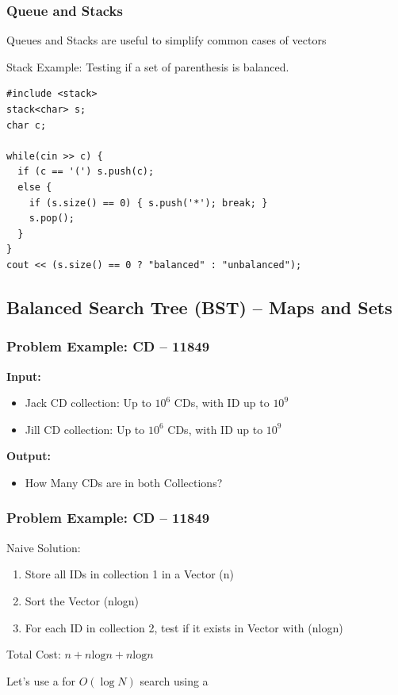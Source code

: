 \begin{frame}[fragile]
  \frametitle{Queue and Stacks}

  \begin{block}{}
    Queues and Stacks are useful to simplify common cases of vectors
  \end{block}

  Stack Example: Testing if a set of parenthesis is balanced.
{\small
\begin{verbatim}
#include <stack>
stack<char> s;
char c;

while(cin >> c) {
  if (c == '(') s.push(c);
  else {
    if (s.size() == 0) { s.push('*'); break; }
    s.pop();
  }
}
cout << (s.size() == 0 ? "balanced" : "unbalanced");

\end{verbatim}}
\end{frame}


\subsection{Balanced Search Tree (BST) -- Maps and Sets}

\begin{frame}
  \frametitle{Problem Example: CD -- 11849}

  \begin{block}{}
    {\bf Input:}
    \begin{itemize}
    \item Jack CD collection: Up to $10^6$ CDs, with ID up to $10^9$
    \item Jill CD collection: Up to $10^6$ CDs, with ID up to $10^9$
    \end{itemize}

    {\bf Output:}
    \begin{itemize}
    \item How Many CDs are in both Collections?
    \end{itemize}

  \end{block}
\end{frame}

\begin{frame}
  \frametitle{Problem Example: CD -- 11849}

  Naive Solution:

  \begin{enumerate}
  \item Store all IDs in collection 1 in a Vector (n)
  \item Sort the Vector (nlogn)
  \item For each ID in collection 2, test if it exists in Vector with  (nlogn)
  \end{enumerate}

  Total Cost: $n + n\text{log}n + n\text{log}n$

  \bigskip

  Let's use a  for $O(\log N)$ search using a 
\end{frame}

